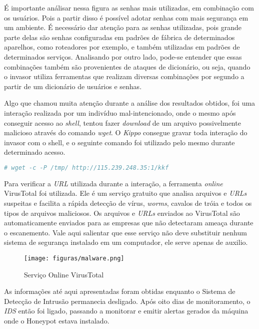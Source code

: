 É importante análisar nessa figura as senhas mais utilizadas, em combinação com os usuários. Pois a partir disso é possível adotar senhas com mais segurança em um ambiente. É necessário dar atenção para as senhas utilizadas, pois grande parte delas são senhas configuradas em padrões de fábrica de determinados aparelhos, como roteadores por exemplo, e também utilizadas em padrões de determinados serviços. Analisando por outro lado, pode-se entender que essas combinações também são provenientes de ataques de dicionário, ou seja, quando o invasor utiliza ferramentas que realizam diversas combinações por segundo a partir de um dicionário de usuários e senhas.

Algo que chamou muita atenção durante a análise dos resultados obtidos, foi uma interação realizada por um indivíduo mal-intencionado, onde o mesmo após conseguir acesso ao \textit{shell}, tentou fazer \textit{download} de um arquivo possivelmente malicioso através do comando \textit{wget}. O \textit{Kippo} consegue gravar toda interação do invasor com o shell, e o seguinte comando foi utilizado pelo mesmo durante determinado acesso.

\begin{lstlisting}[language=bash]
# wget -c -P /tmp/ http://115.239.248.35:1/kkf
\end{lstlisting}

Para verificar a \textit{URL} utilizada durante a interação, a ferramenta \textit{online} VirusTotal foi utilizada. Ele é um serviço gratuito que analisa arquivos e \textit{URLs} suspeitas e facilita a rápida detecção de vírus, \textit{worms}, cavalos de tróia e todos os tipos de arquivos maliciosos. Os arquivos e \textit{URLs} enviados ao VirusTotal são automaticamente enviados para as empresas que não detectaram ameaça durante o escanemento. Vale aqui salientar que esse serviço não deve substituir nenhum sistema de segurança instalado em um computador, ele serve apenas de auxilio.

\begin{figure}[!h]
\centering
\texttt{[image: figuras/malware.png]}
\caption{Serviço Online VirusTotal} 	
\end{figure}

As informações até aqui apresentadas foram obtidas enquanto o Sistema de Detecção de Intrusão permanecia desligado. Após oito dias de monitoramento, o \textit{IDS} então foi ligado, passando a monitorar e emitir alertas gerados da máquina onde o Honeypot estava instalado. 


